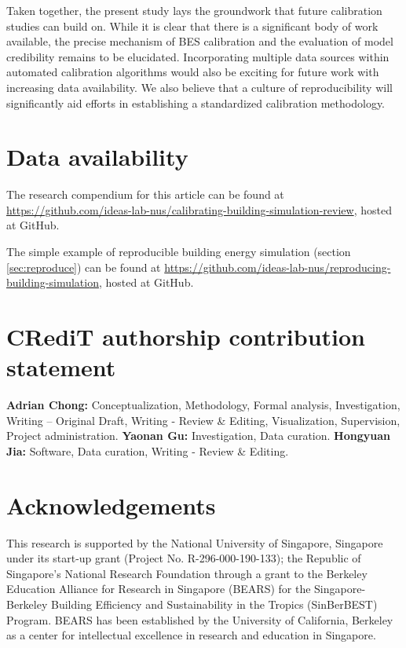 \documentclass[review]{elsarticle}
\begin{document}
Taken together, the present study lays the groundwork that future calibration studies can build on. While it is clear that there is a significant body of work available, the precise mechanism of BES calibration and the evaluation of model credibility remains to be elucidated. Incorporating multiple data sources within automated calibration algorithms would also be exciting for future work with increasing data availability. We also believe that a culture of reproducibility will significantly aid efforts in establishing a standardized calibration methodology. 


\section*{Data availability} \label{sec:open}

The research compendium for this article can be found at \url{https://github.com/ideas-lab-nus/calibrating-building-simulation-review}, hosted at GitHub.

The simple example of reproducible building energy simulation (section \ref{sec:reproduce}) can be found at \url{https://github.com/ideas-lab-nus/reproducing-building-simulation}, hosted at GitHub.



\section*{CRediT authorship contribution statement}
\textbf{Adrian Chong:} Conceptualization, Methodology, Formal analysis, Investigation, Writing – Original Draft, Writing - Review \& Editing, Visualization, Supervision, Project administration. \textbf{Yaonan Gu:} Investigation, Data curation. \textbf{Hongyuan Jia:} Software, Data curation, Writing - Review \& Editing.


\section*{Acknowledgements}
This research is supported by the National University of Singapore, Singapore under its start-up grant (Project No. R-296-000-190-133); the Republic of Singapore's National Research Foundation through a grant to the Berkeley Education Alliance for Research in Singapore (BEARS) for the Singapore-Berkeley Building Efficiency and Sustainability in the Tropics (SinBerBEST) Program. BEARS has been established
by the University of California, Berkeley as a center for intellectual
excellence in research and education in Singapore.


\end{document}
